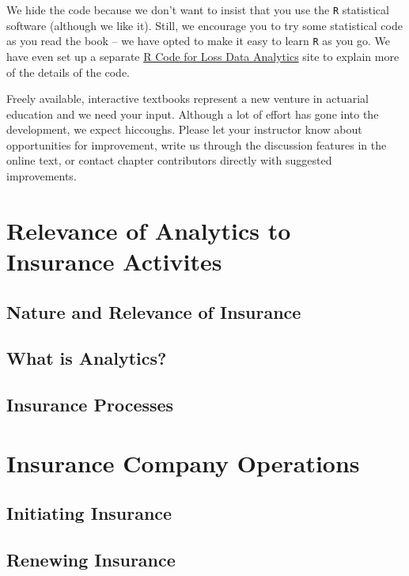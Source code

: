 \documentclass[]{book}
\begin{document}
We hide the code because we don't want to insist that you use the
\texttt{R} statistical software (although we like it). Still, we
encourage you to try some statistical code as you read the book -- we
have opted to make it easy to learn \texttt{R} as you go. We have even
set up a separate \href{https://openacttexts.github.io/LDARcode}{R Code
for Loss Data Analytics} site to explain more of the details of the
code.

Freely available, interactive textbooks represent a new venture in
actuarial education and we need your input. Although a lot of effort has
gone into the development, we expect hiccoughs. Please let your
instructor know about opportunities for improvement, write us through
the discussion features in the online text, or contact chapter
contributors directly with suggested improvements.

\section{Relevance of Analytics to Insurance Activites}\label{S:Intro}

\subsection{Nature and Relevance of
Insurance}\label{nature-and-relevance-of-insurance}

\subsection{What is Analytics?}\label{what-is-analytics}

\subsection{Insurance Processes}\label{S:InsProcesses}

\section{Insurance Company Operations}\label{S:PredModApps}

\subsection{Initiating Insurance}\label{initiating-insurance}

\subsection{Renewing Insurance}\label{renewing-insurance}
\end{document}
